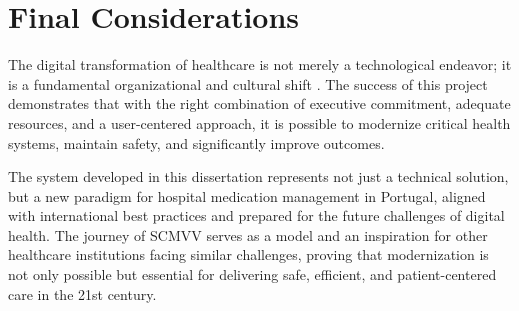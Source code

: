 \section{Final Considerations}

The digital transformation of healthcare is not merely a technological endeavor; it is a fundamental organizational and cultural shift \cite{greenhalgh2017}. The success of this project demonstrates that with the right combination of executive commitment, adequate resources, and a user-centered approach, it is possible to modernize critical health systems, maintain safety, and significantly improve outcomes.

The system developed in this dissertation represents not just a technical solution, but a new paradigm for hospital medication management in Portugal, aligned with international best practices \cite{who2022} and prepared for the future challenges of digital health. The journey of SCMVV serves as a model and an inspiration for other healthcare institutions facing similar challenges, proving that modernization is not only possible but essential for delivering safe, efficient, and patient-centered care in the 21st century. 